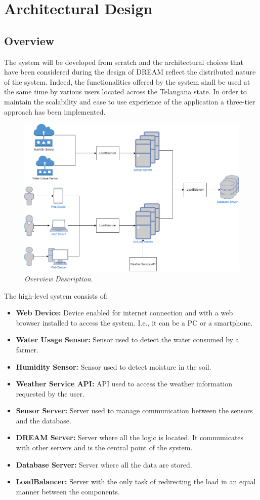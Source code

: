 \section{Architectural Design}
\subsection{Overview}
The system will be developed from scratch and the architectural choices that have been considered during the design of DREAM reflect the distributed nature of the system. Indeed, the functionalities offered by the system shall be used at the same time by various users located across the Telangana state. In order to maintain the scalability and ease to use experience of the application a three-tier approach has been implemented.\\
\begin{figure}[H]
    \centering
    \includegraphics[scale=0.5]{Images/Components/OverviewDiagram.png}
    \caption{\textit{Overview Description}.}
\end{figure}
The high-level system consists of:
\begin{itemize}
    \item \textbf{Web Device:} Device enabled for internet connection and with a web browser installed to access the system. I.e., it can be a PC or a smartphone.
    \item \textbf{Water Usage Sensor:} Sensor used to detect the water consumed by a farmer.
    \item \textbf{Humidity Sensor:} Sensor used to detect moisture in the soil.
    \item \textbf{Weather Service API:} API used to access the weather information requested by the user.
    \item \textbf{Sensor Server:} Server used to manage communication between the sensors and the database.
    \item \textbf{DREAM Server:} Server where all the logic is located. It communicates with other servers and is the central point of the system.
    \item \textbf{Database Server:} Server where all the data are stored.
    \item \textbf{LoadBalancer:} Server with the only task of redirecting the load in an equal manner between the components.
\end{itemize}

